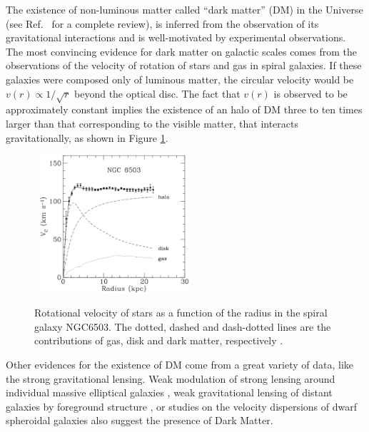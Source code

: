 The existence of non-luminous matter called ``dark matter'' (DM) in the Universe (see Ref.~\cite{Bertone:2004pz} for a complete review), is inferred from the observation of its gravitational interactions and is well-motivated by experimental observations.
The most convincing evidence for dark matter on galactic scales comes from the observations of the velocity of rotation of stars and gas in spiral galaxies.
If these galaxies were composed only of luminous matter, the circular velocity would be $v(r)\propto 1/\sqrt{r}$ beyond the optical disc.
The fact that $v(r)$ is observed to be approximately constant implies the existence of an halo of DM three to ten times larger than that corresponding to the visible matter, that interacts gravitationally, as shown in Figure \ref{fig:DMProofVelocityStars}.

\begin{figure}[!ht]
\begin{center}
\mbox{
\includegraphics[width=0.495\textwidth]{BeyondSM/Figures/GalaxyVelocityRotation.eps}
}
\end{center}
\caption[Rotational velocity of stars as a function of the radius in the spiral galaxy NGC6503.]{Rotational velocity of stars as a function of the radius in the spiral galaxy NGC6503. The dotted, dashed and dash-dotted lines are the contributions of gas, disk and dark matter, respectively \protect\cite{Begeman:1991iy}.}
\label{fig:DMProofVelocityStars}
\end{figure}

Other evidences for the existence of DM come from a great variety of data, like the strong gravitational lensing.
Weak modulation of strong lensing around individual massive elliptical galaxies \cite{Metcalf:2003sz}, weak gravitational lensing of distant galaxies by foreground structure \cite{Hoekstra:2002nf}, or studies on the velocity dispersions of dwarf spheroidal galaxies \cite{Metcalf:2003sz} also suggest the presence of Dark Matter.

